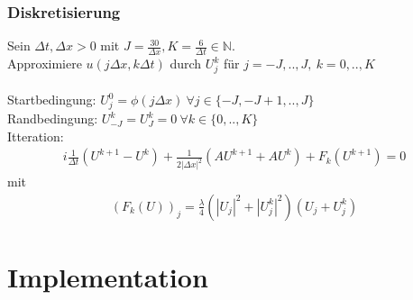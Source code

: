 \documentclass{beamer}
\begin{document}
\begin{frame}
    \frametitle{Diskretisierung}

    Sein $\Delta t, \Delta x>0$ mit $J=\frac{30}{\Delta x},K=\frac{6}{\Delta t}\in\mathbb{N}$.\\
    Approximiere $u(j\Delta x, k\Delta t)$ durch $U_j^k$ f\"ur $j=-J, .. , J,\ k=0, .. , K$\\
    \ \\
    Startbedingung: $U_j^0=\phi(j\Delta x)\ \forall j\in\{-J, -J+1, .., J\}$\\
    Randbedingung: $U_{-J}^k=U_{J}^k=0\ \forall k\in\{0, .., K\}$\\
    Itteration:
    \begin{align*}
        i\frac{1}{\Delta t}(U^{k+1}-U^k)+\frac{1}{2|\Delta x|^2}(AU^{k+1}+AU^k)+F_k(U^{k+1})=0
    \end{align*}
    mit
    \begin{align*}
        (F_k(U))_j = \frac{\lambda}{4}(|U_j|^2+|U_j^k|^2)(U_j+U_j^k)
    \end{align*}

    

\end{frame}


%    




\section{Implementation}

%    
\end{document}
